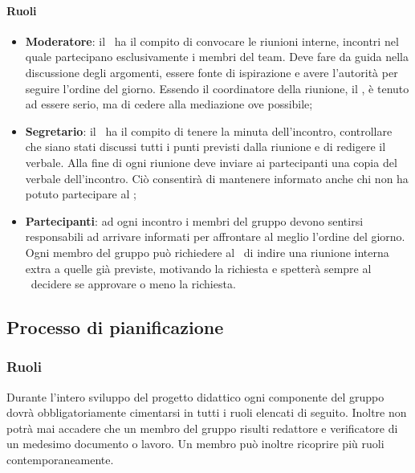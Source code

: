 \documentclass[../NormeDiProgetto.tex]{subfiles}
\begin{document}
	\paragraph{Ruoli}
		\begin{itemize}
			\item \textbf{Moderatore}:
				il \responsabilediprogetto\ ha il compito di convocare le riunioni interne, incontri nel quale partecipano esclusivamente i membri del team. Deve fare da guida nella discussione degli argomenti, essere fonte di ispirazione e avere l'autorità per seguire l'ordine del giorno.
Essendo il coordinatore della riunione, il \responsabilediprogetto, è tenuto ad essere serio, ma di cedere alla mediazione ove possibile;
			\item \textbf{Segretario}:
				il \segretario\ ha il compito di tenere la minuta dell'incontro, controllare che siano stati discussi tutti i punti previsti dalla riunione e di redigere il verbale. Alla fine di ogni riunione deve inviare ai partecipanti una copia del verbale dell'incontro. Ciò consentirà di mantenere informato anche chi non ha potuto partecipare al ;
			\item \textbf{Partecipanti}:
				ad ogni incontro i membri del gruppo devono sentirsi responsabili ad arrivare informati per affrontare al meglio l'ordine del giorno.
Ogni membro del gruppo può richiedere al \responsabilediprogetto\ di indire una riunione interna extra a quelle già previste, motivando la richiesta e spetterà sempre al \responsabilediprogetto\ decidere se approvare o meno la richiesta.

		\end{itemize}

\subsection{Processo di pianificazione}

\subsubsection{Ruoli}
Durante l'intero sviluppo del progetto didattico ogni componente del gruppo
dovrà obbligatoriamente cimentarsi in tutti i ruoli elencati di seguito.
Inoltre non potrà mai accadere che un membro del gruppo risulti redattore e verificatore di un medesimo documento o lavoro.
Un membro può inoltre ricoprire più ruoli contemporaneamente.
\end{document}
